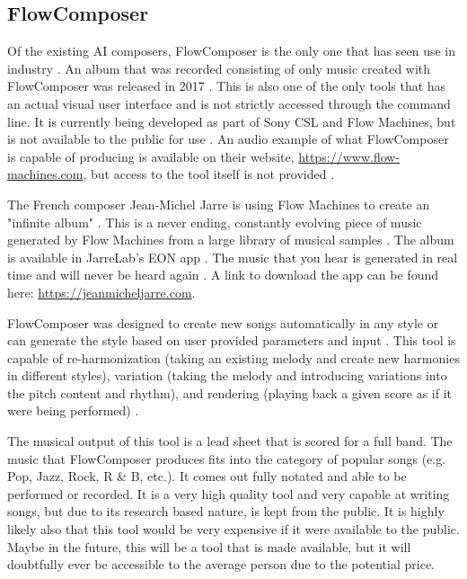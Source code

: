 \subsection{FlowComposer}
\label{subsec:flowcomposer}

Of the existing AI composers, FlowComposer is the only one that has seen use in industry \cite{Papadopoulos_2016}.  An album that was recorded consisting of only music created with FlowComposer was released in 2017 \cite{Papadopoulos_2016}.  This is also one of the only tools that has an actual visual user interface and is not strictly accessed through the command line.  It is currently being developed as part of Sony CSL and Flow Machines, but is not available to the public for use \cite{Papadopoulos_2016}.  An audio example of what FlowComposer is capable of producing is available on their website, \url{https://www.flow-machines.com}, but access to the tool itself is not provided \cite{Flow_2018}.

\vspace{\baselineskip}

The French composer Jean-Michel Jarre is using Flow Machines to create an "infinite album" \cite{Savage_2019}.  This is a never ending, constantly evolving piece of music generated by Flow Machines from a large library of musical samples \cite{Savage_2019}.  The album is available in JarreLab's EON app \cite{Jarre_2019}.  The music that you hear is generated in real time and will never be heard again \cite{Jarre_2019}.  A link to download the app can be found here: \url{https://jeanmicheljarre.com}.

\vspace{\baselineskip}

FlowComposer was designed to create new songs automatically in any style or can generate the style based on user provided parameters and input \cite{Papadopoulos_2016}.  This tool is capable of re-harmonization (taking an existing melody and create new harmonies in different styles), variation (taking the melody and introducing variations into the pitch content and rhythm), and rendering (playing back a given score as if it were being performed) \cite{Flow_2018}.

\vspace{\baselineskip}

The musical output of this tool is a lead sheet that is scored for a full band.  The music that FlowComposer produces fits into the category of popular songs (e.g. Pop, Jazz, Rock, R \& B, etc.).  It comes out fully notated and able to be performed or recorded.  It is a very high quality tool and very capable at writing songs, but due to its research based nature, is kept from the public.  It is highly likely also that this tool would be very expensive if it were available to the public.  Maybe in the future, this will be a tool that is made available, but it will doubtfully ever be accessible to the average person due to the potential price.

